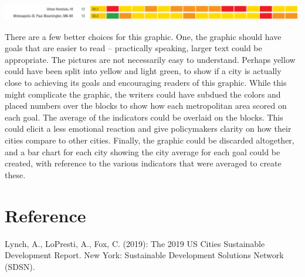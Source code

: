 \documentclass[]{article}
\begin{document}
\includegraphics[width=\textwidth,height=\textheight]{min_hon}

There are a few better choices for this graphic. One, the graphic should
have goals that are easier to read -- practically speaking, larger text
could be appropriate. The pictures are not necessarily easy to
understand. Perhaps yellow could have been split into yellow and light
green, to show if a city is actually close to achieving its goals and
encouraging readers of this graphic. While this might complicate the
graphic, the writers could have subdued the colors and placed numbers
over the blocks to show how each metropolitan area scored on each goal.
The average of the indicators could be overlaid on the blocks. This
could elicit a less emotional reaction and give policymakers clarity on
how their cities compare to other cities. Finally, the graphic could be
discarded altogether, and a bar chart for each city showing the city
average for each goal could be created, with reference to the various
indicators that were averaged to create these.

\hypertarget{reference}{%
\section{Reference}\label{reference}}

Lynch, A., LoPresti, A., Fox, C. (2019): The 2019 US Cities Sustainable
Development Report. New York: Sustainable Development Solutions Network
(SDSN).
\end{document}
